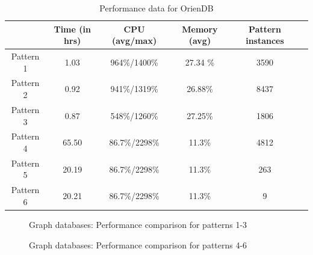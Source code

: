 \begin{table}[htb!]
\begin{center}
\begin{tabular}{|c|c|c|c|c|c|}
\hline
 & Time (in hrs) & CPU (avg/max) & Memory (avg) & Pattern instances\\
\hline
Pattern	1 	& 1.03  &    964\%/1400\%	&   27.34 \% & 3590 \\
Pattern	2 	& 0.92  &    941\%/1319\%	&   26.88\%	&  8437 \\
Pattern	3 	& 0.87  &    548\%/1260\%	&	27.25\%  & 1806\\
Pattern	4 	& 65.50 &    86.7\%/2298\%	&	11.3\%  & 4812  \\
Pattern	5 	& 20.19 &    86.7\%/2298\%	&	11.3\%  & 263 \\
Pattern	6 	& 20.21 &    86.7\%/2298\%	&	11.3\%  & 9 \\

\hline
\end{tabular}
\caption{ Performance data for OrienDB}
\label{table:orient}
\end{center}
\end{table}


\begin{figure}[h!]

	\caption{Graph databases: Performance comparison for patterns 1-3}
	\label{fig:1-3}
	\centering
\end{figure}

\begin{figure}[h!]

	\caption{Graph databases: Performance comparison for patterns 4-6}
	\label{fig:4-6}
	\centering
\end{figure}


